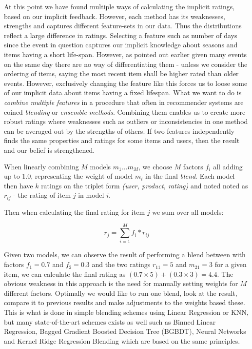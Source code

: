 At this point we have found multiple ways of calculating the implicit ratings,
based on our implicit feedback. However, each method has its weaknesses,
strengths and captures different feature-sets in our data. Thus the
distributions reflect a large difference in ratings. Selecting a feature such
as number of days since the event in question captures our implicit knowledge
about seasons and items having a short life-span. However, as pointed out
earlier given many events on the same day there are no way of differentiating
them - unless we consider the ordering of items, saying the most recent item
shall be higher rated than older events. However, exclusively changing the
feature like this forces us to loose some of our implicit data about items
having a fixed lifespan. What we want to do is \textit{combine multiple 
features} in a procedure that often in recommender systems are coined
\textit{blending} or \textit{ensemble methods}. Combining them enables us to
create more robust ratings where weaknesses such as outliers or inconsistencies
in one method can be averaged out by the strengths of others. If two features
independently finds the same properties and ratings for some items and users,
then the result and our belief is strengthened.

When linearly combining $M$ models $m_1 \dots m_M$, we choose $M$ factors $f_i$
all adding up to 1.0, representing the weight of model $m_{i}$ in the final
\textit{blend}. Each model then have $k$ ratings on the triplet form
\textit{(user, product, rating)} and noted noted as $r_{ij}$ - the rating of
item $j$ in model $i$.

Then when calculating the final rating for item $j$ we sum over all
models:

\begin{equation}
  r_j = \sum _{i=1}^{M} f_{i} * r_{ij}
\end{equation}

Given two models, we can observe the result of performing a blend between with
factors $f_1 = 0.7$ and $f_2 = 0.3$ and the two ratings $r_{11} = 5$ and
$m_{21} = 3$ for a given item, we can calculate the final rating as $(0.7
\times 5) + (0.3 \times 3) = 4.4$. The obvious weakness in this approach is the
need for manually setting weights for $M$ different factors. Optimally we would
like to run one blend, look at the result, compare it to previous results and
make adjustments to the weights based these. This is what is done in simple
blending schemes using Linear Regression or KNN, but many state-of-the-art
schemes exists as well such as Binned Linear Regression, Bagged Gradient
Boosted Decision Tree (BGBDT), Neural Networks and Kernel Ridge Regression
Blending \cite{jahrer2010combining} \cite{toscher2009bigchaos} which are based
on the same principles.


